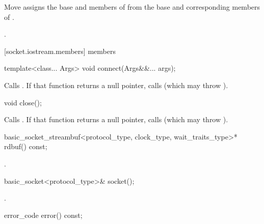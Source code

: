 \begin{itemdescr}
\pnum
\effects Move assigns the base and members of  from the base and corresponding members of .

\pnum
\returns {}.
\end{itemdescr}



[socket.iostream.members]{ members}

\begin{itemdecl}
template<class... Args>
  void connect(Args&&... args);
\end{itemdecl}

\begin{itemdescr}
\pnum
\effects Calls . If that function returns a null pointer, calls  (which may throw ).
\end{itemdescr}

\begin{itemdecl}
void close();
\end{itemdecl}

\begin{itemdescr}
\pnum
\effects Calls . If that function returns a null pointer, calls  (which may throw ).
\end{itemdescr}

\begin{itemdecl}
basic_socket_streambuf<protocol_type, clock_type, wait_traits_type>* rdbuf() const;
\end{itemdecl}

\begin{itemdescr}
\pnum
\returns {}.
\end{itemdescr}

\begin{itemdecl}
basic_socket<protocol_type>& socket();
\end{itemdecl}

\begin{itemdescr}
\pnum
\returns {}.
\end{itemdescr}

\begin{itemdecl}
error_code error() const;
\end{itemdecl}

